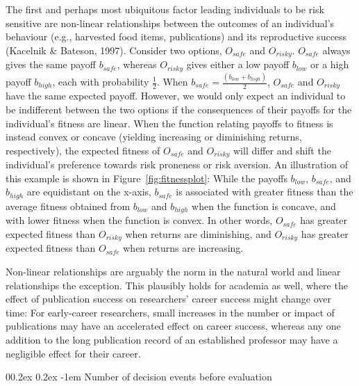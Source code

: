 \documentclass[
  ,man,mask,floatsintext]{apa6}
\makeatletter
\let\oldparagraph\paragraph
\renewcommand{\paragraph}[1]{\oldparagraph{#1}\mbox{}}
\renewcommand{\paragraph}{\@startsection{paragraph}{4}{\parindent}%
  {0\baselineskip \@plus 0.2ex \@minus 0.2ex}%
  {-1em}%
  {\normalfont\normalsize\bfseries\itshape\typesectitle}}
\makeatother
\begin{document}
The first and perhaps most ubiquitous factor leading individuals to be risk sensitive are non-linear relationships between the outcomes of an individual's behaviour (e.g., harvested food items, publications) and its reproductive success (Kacelnik \& Bateson, 1997).
Consider two options, \(O_{safe}\) and \(O_{risky}\).
\(O_{safe}\) always gives the same payoff \(b_{safe}\), whereas \(O_{risky}\) gives either a low payoff \(b_{low}\) or a high payoff \(b_{high}\), each with probability \(\frac{1}{2}\).
When \(b_{safe} = \frac{(b_{low} + b_{high})}{2}\), \(O_{safe}\) and \(O_{risky}\) have the same expected payoff.
However, we would only expect an individual to be indifferent between the two options if the consequences of their payoffs for the individual's fitness are linear.
When the function relating payoffs to fitness is instead convex or concave (yielding increasing or diminishing returns, respectively), the expected fitness of \(O_{safe}\) and \(O_{risky}\) will differ and shift the individual's preference towards risk proneness or risk aversion.
An illustration of this example is shown in Figure~\ref{fig:fitnessplot}:
While the payoffs \(b_{low}\), \(b_{safe}\), and \(b_{high}\) are equidistant on the x-axis, \(b_{safe}\) is associated with greater fitness than the average fitness obtained from \(b_{low}\) and \(b_{high}\) when the function is concave, and with lower fitness when the function is convex.
In other words, \(O_{safe}\) has greater expected fitness than \(O_{risky}\) when returns are diminishing, and \(O_{risky}\) has greater expected fitness than \(O_{safe}\) when returns are increasing.

Non-linear relationships are arguably the norm in the natural world and linear relationships the exception.
This plausibly holds for academia as well, where the effect of publication success on researchers' career success might change over time:
For early-career researchers, small increases in the number or impact of publications may have an accelerated effect on career success, whereas any one addition to the long publication record of an established professor may have a negligible effect for their career.

\hypertarget{number-of-decision-events-before-evaluation}{%
\paragraph{Number of decision events before evaluation}\label{number-of-decision-events-before-evaluation}}
\end{document}
